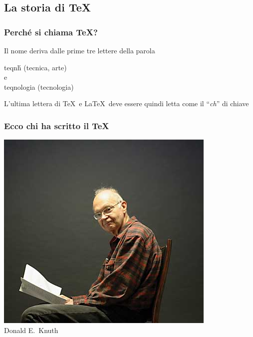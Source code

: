 \documentclass[svgnames,%
	ucs,%
	pdftex]{guitbeamer}
\begin{document}
\subsection{La storia di \TeX}
\begin{frame}
  \frametitle{Perch\'e si chiama \TeX?}
	Il nome deriva dalle prime tre lettere della parola\\[.5cm]
	\begin{center}
		\alert{\large\foreignlanguage{greek}{teqn\'h}}
		(tecnica, arte)\\
		e\\
		\alert{\large\foreignlanguage{greek}{teqnologia}}
		(tecnologia)
	\end{center} 
  \bigskip
	\begin{center}
		L'ultima lettera di \TeX\ e \LaTeX\ deve essere quindi letta
		come il ``\emph{ch}'' di chiave
	\end{center}
\end{frame}
\begin{frame}
  \frametitle{Ecco chi ha scritto il \TeX}
	\begin{center}
		\includegraphics[scale=.5]{knuth}\\[.5em]
		\large Donald E.\ Knuth
	\end{center}
\end{frame}
\end{document}
